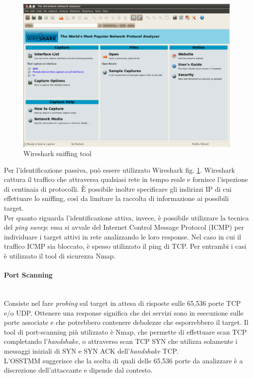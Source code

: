 \begin{figure}[hbtp]
	\centering
	\includegraphics[scale=.3]{imgs/attack/wireshark.png}
	\caption{Wireshark sniffing tool}
	\label{wireshark_img}
\end{figure}

Per l'identificazione passiva, può essere utilizzato Wireshark fig. \ref{wireshark_img}.\cite{wireshark} Wireshark cattura il traffico che attraversa qualsiasi rete in tempo reale e fornisce l'ispezione di centinaia di protocolli. È possibile inoltre specificare gli indirizzi IP di cui effettuare lo sniffing, così da limitare la raccolta di informazione ai possibili target.\\
Per quanto riguarda l'identificazione attiva, invece, è possibile utilizzare la tecnica del \emph{ping sweep}: essa si avvale del Internet Control Message Protocol (ICMP) per individuare i target attivi in rete analizzando le loro response. Nel caso in cui il traffico ICMP sia bloccato, è spesso utilizzato il ping di TCP. Per entrambi i casi è utilizzato il tool di sicurezza Nmap.\cite{nmap}

\paragraph{Port Scanning}\mbox{}\\
Consiste nel fare \emph{probing} sul target in attesa di risposte sulle 65,536 porte TCP e/o UDP. Ottenere una response significa che dei servizi sono in esecuzione sulle porte associate e che potrebbero contenere debolezze che esporrebbero il target. Il tool di port-scanning più utilizzato è Nmap, che permette di effettuare scan TCP completando l'\emph{handshake}, o attraverso scan TCP SYN che utilizza solamente i messaggi iniziali di SYN e SYN ACK dell'\emph{handshake} TCP.\\
L'OSSTMM suggerisce che la scelta di quali delle 65,536 porte da analizzare è a discrezione dell'attaccante e dipende dal contesto.

